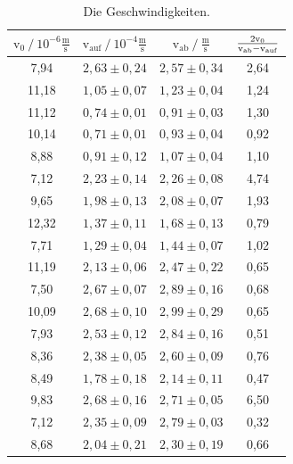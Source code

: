 \begin{table}[H] 
    \centering
    \caption{Die Geschwindigkeiten.} 
    \label{Tabelle2}
    \begin{tabular} {c  c  c  c}
        \toprule
        {$ \text{v}_{0}          \mathbin{/} 10^{-6}\frac{\unit{\meter}}{\unit{\second}} $} &
        {$ \text{v}_{\text{auf}} \mathbin{/} 10^{-4}\frac{\unit{\meter}}{\unit{\second}} $} &
        {$ \text{v}_{\text{ab}}  \mathbin{/} \frac{\unit{\meter}}{\unit{\second}} $} &
        {$ \frac{2\text{v}_{0}}{\text{v}_{\text{ab}} - \text{v}_\text{\text{auf}}}$} \\
        \midrule
        \rowcolor{red}7,94  & $ 2,63 \pm 0,24 $ & $ 2,57 \pm 0,34 $ & 2,64\\
        11,18 & $ 1,05 \pm 0,07 $ & $ 1,23 \pm 0,04 $ & 1,24\\
        \rowcolor{red}11,12 & $ 0,74 \pm 0,01 $ & $ 0,91 \pm 0,03 $ & 1,30\\
        10,14 & $ 0,71 \pm 0,01 $ & $ 0,93 \pm 0,04 $ & 0,92\\
        8,88  & $ 0,91 \pm 0,12 $ & $ 1,07 \pm 0,04 $ & 1,10\\
        \hline
        \rowcolor{red}7,12  & $ 2,23 \pm 0,14 $ & $ 2,26 \pm 0,08 $ & 4,74\\
        \rowcolor{red}9,65  & $ 1,98 \pm 0,13 $ & $ 2,08 \pm 0,07 $ & 1,93\\
        12,32 & $ 1,37 \pm 0,11 $ & $ 1,68 \pm 0,13 $  & 0,79\\
        7,71  & $ 1,29 \pm 0,04 $ & $ 1,44 \pm 0,07 $ & 1,02\\
        \rowcolor{red}11,19 & $ 2,13 \pm 0,06 $ & $ 2,47 \pm 0,22 $ & 0,65\\
        \hline
        \rowcolor{red}7,50  & $ 2,67 \pm 0,07 $ & $ 2,89 \pm 0,16 $ & 0,68\\
        \rowcolor{red}10,09 & $ 2,68 \pm 0,10 $ & $ 2,99 \pm 0,29 $ & 0,65\\
        \rowcolor{red}7,93  & $ 2,53 \pm 0,12 $ & $ 2,84 \pm 0,16 $ & 0,51\\
        8,36  & $ 2,38 \pm 0,05 $ & $ 2,60 \pm 0,09 $ & 0,76\\
        \rowcolor{red}8,49  & $ 1,78 \pm 0,18 $ & $ 2,14 \pm 0,11 $ & 0,47\\
        \hline
        \rowcolor{red}9,83  & $ 2,68 \pm 0,16 $ & $ 2,71 \pm 0,05 $ & 6,50\\
        \rowcolor{red}7,12  & $ 2,35 \pm 0,09 $ & $ 2,79 \pm 0,03 $ & 0,32\\
        \rowcolor{red}8,68  & $ 2,04 \pm 0,21 $ & $ 2,30 \pm 0,19 $ & 0,66\\

\end{tabular}
\end{table}
